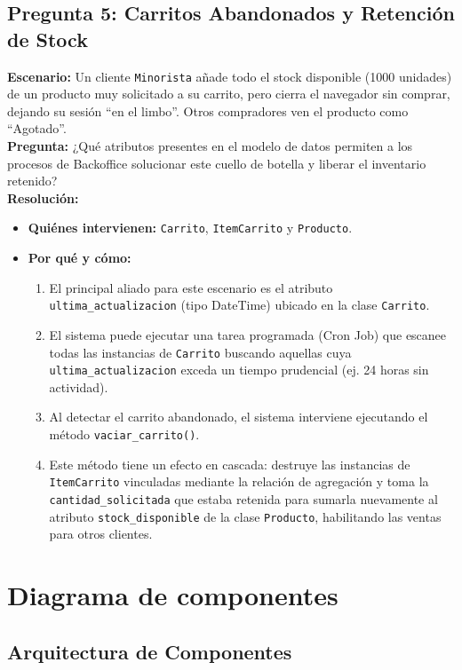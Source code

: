\documentclass[12pt,a4paper]{report}
\begin{document}
\subsection*{Pregunta 5: Carritos Abandonados y Retención de Stock}
\textbf{Escenario:} Un cliente \texttt{Minorista} añade todo el stock disponible (1000 unidades) de un producto muy solicitado a su carrito, pero cierra el navegador sin comprar, dejando su sesión ``en el limbo''. Otros compradores ven el producto como ``Agotado''.\\
\textbf{Pregunta:} ¿Qué atributos presentes en el modelo de datos permiten a los procesos de Backoffice solucionar este cuello de botella y liberar el inventario retenido?\\
\textbf{Resolución:}
\begin{itemize}
    \item \textbf{Quiénes intervienen:} \texttt{Carrito}, \texttt{ItemCarrito} y \texttt{Producto}.
    \item \textbf{Por qué y cómo:}
    \begin{enumerate}
        \item El principal aliado para este escenario es el atributo \texttt{ultima\_actualizacion} (tipo DateTime) ubicado en la clase \texttt{Carrito}.
        \item El sistema puede ejecutar una tarea programada (Cron Job) que escanee todas las instancias de \texttt{Carrito} buscando aquellas cuya \texttt{ultima\_actualizacion} exceda un tiempo prudencial (ej. 24 horas sin actividad).
        \item Al detectar el carrito abandonado, el sistema interviene ejecutando el método \texttt{vaciar\_carrito()}.
        \item Este método tiene un efecto en cascada: destruye las instancias de \texttt{ItemCarrito} vinculadas mediante la relación de agregación y toma la \texttt{cantidad\_solicitada} que estaba retenida para sumarla nuevamente al atributo \texttt{stock\_disponible} de la clase \texttt{Producto}, habilitando las ventas para otros clientes.
    \end{enumerate}
\end{itemize}

\section{Diagrama de componentes}

\subsection*{Arquitectura de Componentes}
\end{document}
